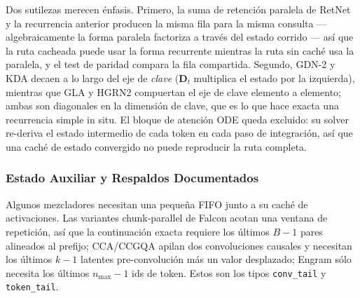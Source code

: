 Dos sutilezas merecen énfasis. Primero, la suma de retención paralela de RetNet y la recurrencia anterior producen la misma fila para la misma consulta --- algebraicamente la forma paralela factoriza a través del estado corrido --- así que la ruta cacheada puede usar la forma recurrente mientras la ruta sin caché usa la paralela, y el test de paridad compara la fila compartida. Segundo, GDN-2 y KDA decaen a lo largo del eje de \emph{clave} ($\mathbf{D}_t$ multiplica el estado por la izquierda), mientras que GLA y HGRN2 compuertan el eje de clave elemento a elemento; ambas son diagonales en la dimensión de clave, que es lo que hace exacta una recurrencia simple in situ. El bloque de atención ODE queda excluido: su solver re-deriva el estado intermedio de cada token en cada paso de integración, así que una caché de estado convergido no puede reproducir la ruta completa.

\subsubsection{Estado Auxiliar y Respaldos Documentados}
\label{sec:kv-fallbacks}

Algunos mezcladores necesitan una pequeña FIFO junto a su caché de activaciones. Las variantes chunk-parallel de Falcon acotan una ventana de repetición, así que la continuación exacta requiere los últimos $B-1$ pares alineados al prefijo; CCA/CCGQA apilan dos convoluciones causales y necesitan los últimos $k-1$ latentes pre-convolución más un valor desplazado; Engram sólo necesita los últimos $n_{\max}-1$ ids de token. Estos son los tipos \texttt{conv\_tail} y \texttt{token\_tail}.

